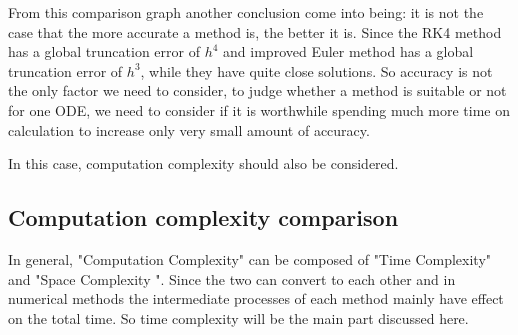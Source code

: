 \documentclass[a4paper]{article}
\begin{document}
	From this comparison graph another conclusion come into being: it is not the case that the more accurate a method is, the better it is. Since the RK4 method has a global truncation error of $h^4$ and improved Euler method has a global truncation error of $h^3$, while they have quite close solutions. So accuracy is not the only factor we need to consider, to judge whether a method is suitable or not for one ODE, we need to consider if it is worthwhile spending much more time on calculation to increase only very small amount of accuracy. 
	
	In this case, computation complexity should also be considered.
	
	\subsection{Computation complexity comparison}
	
	In general, "Computation Complexity" can be composed of "Time Complexity" and "Space Complexity ". Since the two can convert to each other and in numerical methods the intermediate processes of each method mainly have effect on the total time. So time complexity will be the main part discussed here.
	
\end{document}

